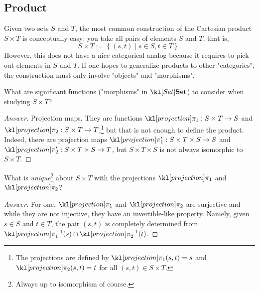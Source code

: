 \documentclass[main.tex]{subfiles}
\begin{document}
\subsection{Product}
Given two sets $S$ and $T$, the most common construction of the Cartesian product $S \times T$ is conceptually easy: you take all pairs of elements $S$ and $T$, that is,
\[S\times T := \left\{ (s,t) \mid s \in S, t \in T\right\}.\]
However, this does not have a nice categorical analog because it requires to pick out elements in $S$ and $T$. If one hopes to generalize products to other "categories", the construction must only involve "objects" and "morphisms".
\begin{quest}
    What are significant functions ("morphisms" in $\catSet$) to consider when studying $S \times T$?
\end{quest}
\begin{proof}[Answer]
    Projection maps. They are functions $\projection_1: S\times T \rightarrow S$ and $\projection_2: S\times T \rightarrow T$,\footnote{The projections are defined by $\projection_1(s,t) = s$ and $\projection_2(s,t)= t$ for all $(s,t) \in S \times T$.} but that is not enough to define the product. Indeed, there are projection maps $\projection_1': S\times T \times S \rightarrow S$ and $\projection_2' : S \times T \times S \rightarrow T$, but $S \times T \times S$ is not always isomorphic to $S\times T$.
\end{proof}
\begin{quest}
    What is \textit{unique}\footnote{Always up to isomorphism of course.} about $S\times T$ with the projections $\projection_1$ and $\projection_2$?
\end{quest}
\begin{proof}[Answer]
For one, $\projection_1$ and $\projection_2$ are surjective and while they are not injective, they have an invertible-like property. Namely, given $s \in S$ and $t \in T$, the pair $(s, t)$ is completely determined from $\projection_1^{-1}(s) \cap \projection_2^{-1}(t)$.
\end{proof}
\end{document}
